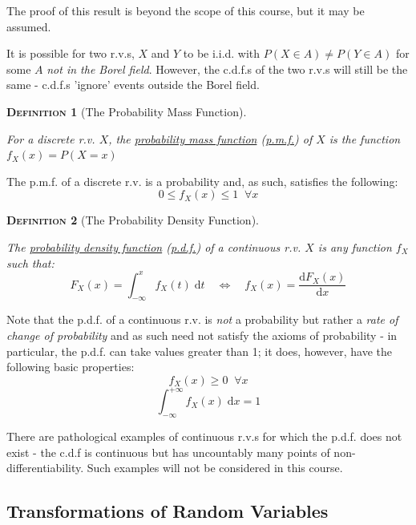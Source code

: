\documentclass[12pt,a4paper]{article}
\newtheorem{definition}{\textsc{Definition}}[section]
\begin{document}
\noindent The proof of this result is beyond the scope of this course, but it may be assumed.\par
\vspace{1cm}
\indent It is possible for two r.v.s, $X$ and $Y$ to be i.i.d. with $P(X \in A) \neq P(Y \in A)$ for some $A$ {\it not in the Borel field}. However, the c.d.f.s of the two r.v.s will still be the same - c.d.f.s 'ignore' events outside the Borel field.

\begin{definition}[The Probability Mass Function]$\;$\par
\vspace{1cm}

For a discrete r.v. $X$, the \underline{probability mass function} (\underline{p.m.f.}) of $X$ is the function $f_X(x) = P(X = x)$
\end{definition}

\noindent The p.m.f. of a discrete r.v. is a probability and, as such, satisfies the following:
$$0 \leq f_X(x) \leq 1 \;\;\forall x$$

\begin{definition}[The Probability Density Function]$\;$\par
\vspace{1cm}

The \underline{probability density function} (\underline{p.d.f.}) of a continuous r.v. $X$ is any function $f_X$ such that:
$$F_X(x) = \int_{-\infty}^x\!\!f_X(t)\;\mathrm{d}t \quad \Leftrightarrow\quad f_X(x) = \frac{\mathrm{d}F_X(x)}{\mathrm{d}x}$$
\end{definition}

Note that the p.d.f. of a continuous r.v. is {\it not} a probability but rather a {\it rate of change of probability} and as such need not satisfy the axioms of probability - in particular, the p.d.f. can take values greater than 1; it does, however, have the following basic properties:
$$f_X(x) \geq 0 \;\;\forall x$$
$$\int_{- \infty}^{+ \infty}\!\!f_X(x)\;\mathrm{d}x = 1$$

There are pathological examples of continuous r.v.s for which the p.d.f. does not exist - the c.d.f is continuous but has uncountably many points of non-differentiability. Such examples will not be considered in this course.

\subsection{Transformations of Random Variables}$\;$
\end{document}
